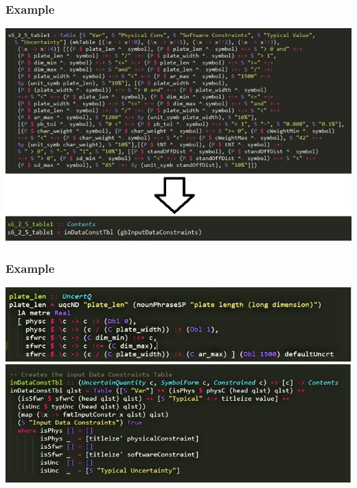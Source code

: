 \documentclass{beamer}
\begin{document}
\begin{frame}
\frametitle{Example}
\centering
\includegraphics[scale=0.6]{CodeComparisons.jpg}
\end{frame}

\begin{frame}
\frametitle{Example}
\centering
\includegraphics[height=0.25\textheight]{ChunkEx.jpg}
\newline
\newline
\newline
\includegraphics[height=0.40\textheight]{inDataConstTbl.jpg}
\end{frame}
\end{document}
